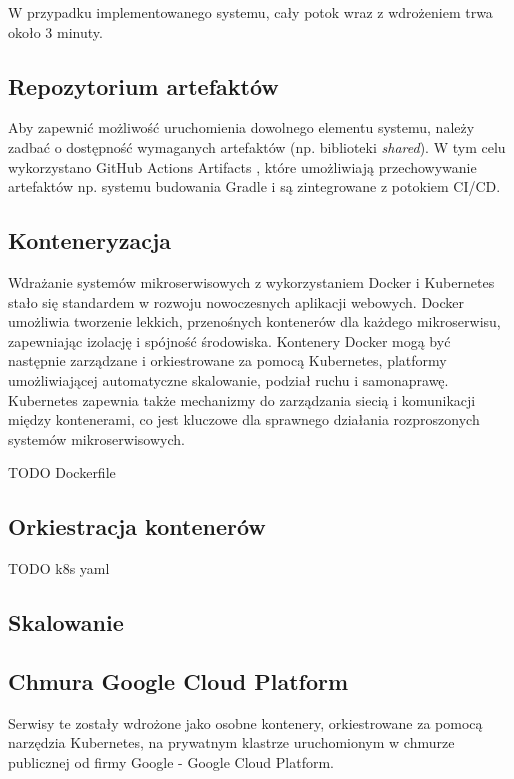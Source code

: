W przypadku implementowanego systemu, cały potok wraz z wdrożeniem trwa około 3 minuty.

\subsection{Repozytorium artefaktów}

Aby zapewnić możliwość uruchomienia dowolnego elementu systemu, należy zadbać o dostępność wymaganych artefaktów (np. biblioteki \textit{shared}). W tym celu wykorzystano GitHub Actions Artifacts \cite{gaa}, które umożliwiają przechowywanie artefaktów np. systemu budowania Gradle i są zintegrowane z potokiem CI/CD.

\subsection{Konteneryzacja}

Wdrażanie systemów mikroserwisowych z wykorzystaniem Docker i Kubernetes stało się standardem w rozwoju nowoczesnych aplikacji webowych. Docker umożliwia tworzenie lekkich, przenośnych kontenerów dla każdego mikroserwisu, zapewniając izolację i spójność środowiska. Kontenery Docker mogą być następnie zarządzane i orkiestrowane za pomocą Kubernetes, platformy umożliwiającej automatyczne skalowanie, podział ruchu  i samonaprawę. Kubernetes zapewnia także mechanizmy do zarządzania siecią i komunikacji między kontenerami, co jest kluczowe dla sprawnego działania rozproszonych systemów mikroserwisowych.

TODO Dockerfile

\subsection{Orkiestracja kontenerów}

TODO k8s yaml

\subsection{Skalowanie}

\subsection{Chmura Google Cloud Platform}

Serwisy te zostały wdrożone jako osobne kontenery, orkiestrowane za pomocą narzędzia Kubernetes, na prywatnym klastrze uruchomionym w chmurze publicznej od firmy Google - Google Cloud Platform.


